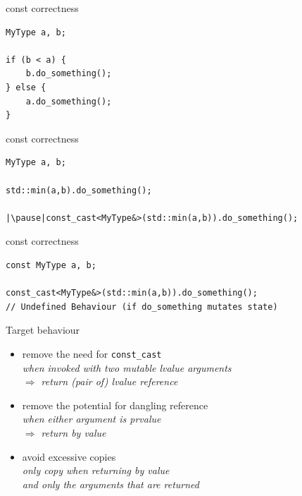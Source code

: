 \documentclass[aspectratio=169]{beamer}
\begin{document}
\begin{frame}[fragile]{const correctness}
\pause\begin{verbatim}
MyType a, b;

if (b < a) {
    b.do_something();
} else {
    a.do_something();
}
\end{verbatim}
\end{frame}

\begin{frame}[fragile]{const correctness}
\begin{verbatim}
MyType a, b;

std::min(a,b).do_something();

|\pause|const_cast<MyType&>(std::min(a,b)).do_something();
\end{verbatim}
\end{frame}

\begin{frame}[fragile]{const correctness}
\begin{verbatim}
const MyType a, b;

const_cast<MyType&>(std::min(a,b)).do_something();
// Undefined Behaviour (if do_something mutates state)
\end{verbatim}
\end{frame}


\begin{frame}[c]{}
\end{frame}

\begin{frame}{Target behaviour}
\begin{itemize}
    \item<1-> remove the need for \texttt{const_cast}\\
    \small{\textit{when invoked with two mutable lvalue arguments\\
    \hspace{2em}$\Rightarrow$ return (pair of) lvalue reference}}
    \item<2-> remove the potential for dangling reference\\
    \small{\textit{when either argument is prvalue\\
    \hspace{2em}$\Rightarrow$ return by value}}
    \item<3-> avoid excessive copies\\
    \small{\textit{only copy when returning by value\\
    and only the arguments that are returned}}
\end{itemize}
\end{frame}
\end{document}
